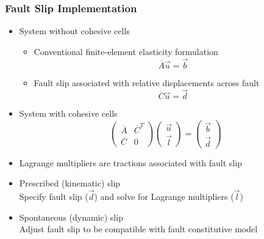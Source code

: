 \documentclass{beamer}
\newcommand{\tensor}[1]{\overline{#1}}
\begin{document}
\begin{frame}
  \frametitle{Fault Slip Implementation}

  \begin{itemize}
  \item System without cohesive cells
    \begin{itemize}
    \item Conventional finite-element elasticity formulation
      \begin{equation}
        \tensor{A} \vec{u} = \vec{b} \nonumber
      \end{equation}
    \item Fault slip associated with relative displacements across fault
      \begin{equation}
        \tensor{C} \vec{u} = \vec{d} \nonumber
      \end{equation}
    \end{itemize}
  \item System with cohesive cells
    \begin{equation}
      \left( \begin{array}{cc}
          \tensor{A} & \tensor{C}^T\\
          \tensor{C} & 0
        \end{array} \right)
      \left( \begin{array}{c}
          \vec{u}\\
          \vec{l}
        \end{array}\right)
      =
      \left( \begin{array}{c}
          \vec{b}\\
          \vec{d}
        \end{array} \right)
      \nonumber
    \end{equation}
  \item Lagrange multipliers are tractions associated with fault slip
  \item Prescribed (kinematic) slip\\
    Specify fault slip ($\vec{d}$) and solve for Lagrange multipliers ($\vec{l}$)
  \item Spontaneous (dynamic) slip\\
    Adjust fault slip to be compatible with fault constitutive model
\end{itemize}
  
\end{frame}
\end{document}
